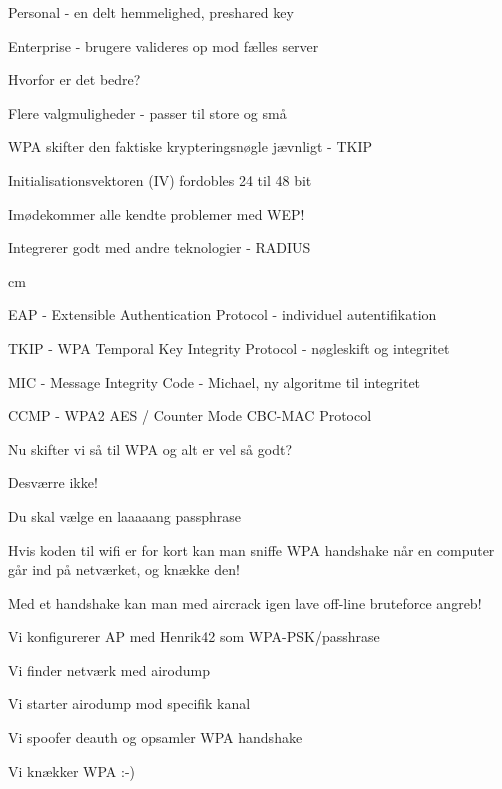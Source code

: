 \documentclass[20pt,landscape,a4paper,footrule]{foils}
\begin{document}
\begin{list1}
\item Personal - en delt hemmelighed, preshared key
\item Enterprise - brugere valideres op mod fælles server
\item Hvorfor er det bedre?
\begin{list2}
\item Flere valgmuligheder - passer til store og små
\item WPA skifter den faktiske krypteringsnøgle jævnligt - TKIP
\item Initialisationsvektoren (IV) fordobles 24 til 48 bit
\item Imødekommer alle kendte problemer med WEP!
\item Integrerer godt med andre teknologier - RADIUS

 cm
\item EAP - Extensible Authentication Protocol - individuel autentifikation
\item TKIP - WPA Temporal Key Integrity Protocol - nøgleskift og integritet
\item MIC - Message Integrity Code - Michael, ny algoritme til integritet
\item CCMP - WPA2 AES / Counter Mode CBC-MAC Protocol
\end{list2}

\end{list1}



\begin{list1}
\item Nu skifter vi så til WPA og alt er vel så godt?
\pause
\item Desværre ikke!
\item Du skal vælge en laaaaang passphrase
\item Hvis koden til wifi er for kort kan man sniffe WPA
  handshake når en computer går ind på netværket, og knække den!
\item Med et handshake kan man med aircrack igen lave off-line
  bruteforce angreb!
\end{list1}


\begin{list1}
\item Vi konfigurerer AP med Henrik42 som WPA-PSK/passhrase
\item Vi finder netværk med airodump
\item Vi starter airodump mod specifik kanal
\item Vi spoofer deauth og opsamler WPA handshake
\item Vi knækker WPA :-)
\end{list1}
\end{document}
